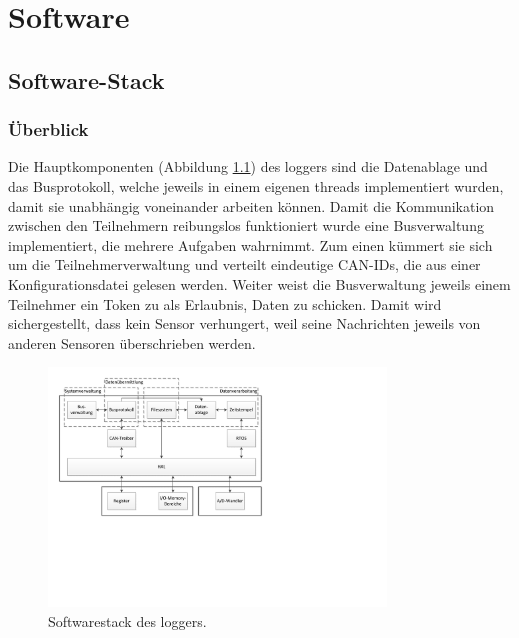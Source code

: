 %
%

\chapter{Software}\label{chap.software}


\section{Software-Stack}\label{sec.sw_stack}


\subsection{Überblick}\label{subsec.sw_ueberblick}
Die Hauptkomponenten (Abbildung \ref{fig.swlogger}) des \gls{logger}s sind die Datenablage und das Busprotokoll, welche jeweils in einem eigenen \glspl{thread} implementiert wurden, damit sie unabhängig voneinander arbeiten können. Damit die Kommunikation zwischen den Teilnehmern reibungslos funktioniert wurde eine Busverwaltung implementiert, die mehrere Aufgaben wahrnimmt. Zum einen kümmert sie sich um die Teilnehmerverwaltung und verteilt eindeutige CAN-IDs, die aus einer Konfigurationsdatei gelesen werden. Weiter weist die Busverwaltung jeweils einem Teilnehmer ein Token zu als Erlaubnis, Daten zu schicken. Damit wird sichergestellt, dass kein Sensor verhungert, weil seine Nachrichten jeweils von anderen Sensoren überschrieben werden. 

\begin{figure}
	\centering
		\includegraphics[width=0.8\textwidth]{images/visio/Softwarestack_Logger.pdf}
	\caption{Softwarestack des \gls{logger}s.}
	\label{fig.swlogger}
\end{figure}

